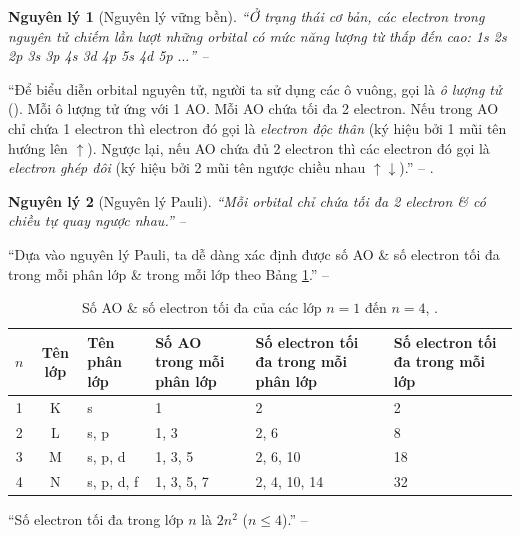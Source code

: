 \documentclass{article}
\numberwithin{equation}{section}
\newtheorem{nguyenly}{Nguyên lý}[section]
\begin{document}
\begin{nguyenly}[Nguyên lý vững bền]
	``Ở trạng thái cơ bản, các electron trong nguyên tử chiếm lần lượt những orbital có mức năng lượng từ thấp đến cao: 1s 2s 2p 3s 3p 4s 3d 4p 5s 4d 5p $\ldots$'' -- \cite[p. 30]{SGK_Hoa_Hoc_10_Chan_Troi_Sang_Tao}
\end{nguyenly}
``Để biểu diễn orbital nguyên tử, người ta sử dụng các ô vuông, gọi là \textit{ô lượng tử} (\cite[Hình 4.8: \textsf{(a) Chiều chuyển động tự quay của electron quanh trục của nó; (b) Cách biểu diễn 2 electron trong 1 orbital}, p. 30]{SGK_Hoa_Hoc_10_Chan_Troi_Sang_Tao}). Mỗi ô lượng tử ứng với 1 AO. Mỗi AO chứa tối đa 2 electron. Nếu trong AO chỉ chứa 1 electron thì electron đó gọi là \textit{electron độc thân} (ký hiệu bởi 1 mũi tên hướng lên $\uparrow$). Ngược lại, nếu AO chứa đủ 2 electron thì các electron đó gọi là \textit{electron ghép đôi} (ký hiệu bởi 2 mũi tên ngược chiều nhau $\uparrow\downarrow$).'' -- \cite[p. 30]{SGK_Hoa_Hoc_10_Chan_Troi_Sang_Tao}. \cite[Hình 4.9: \textsf{(a) Electron ghép đôi \& electron độc thân; (b) Sự sắp xếp electron trên các orbital của nguyên tử oxygen.}, p. 30]{SGK_Hoa_Hoc_10_Chan_Troi_Sang_Tao}

\begin{nguyenly}[Nguyên lý Pauli]
	``Mỗi orbital chỉ chứa tối đa 2 electron \& có chiều tự quay ngược nhau.'' -- \cite[p. 30]{SGK_Hoa_Hoc_10_Chan_Troi_Sang_Tao}
\end{nguyenly}
``Dựa vào nguyên lý Pauli, ta dễ dàng xác định được số AO \& số electron tối đa trong mỗi phân lớp \& trong mỗi lớp theo Bảng \ref{tab:so AO & so electron toi da cua cac lop n = 1 den n = 4}.'' -- \cite[p. 30]{SGK_Hoa_Hoc_10_Chan_Troi_Sang_Tao}

\begin{table}[h]
	\centering
	\begin{tabular}{|c|c|l|l|p{4cm}|p{3.5cm}|}
		\hline
		$n$ & \textbf{Tên lớp} & \textbf{Tên phân lớp} & \textbf{Số AO trong mỗi phân lớp} & \textbf{Số electron tối đa trong mỗi phân lớp} & \textbf{Số electron tối đa trong mỗi lớp} \\
		\hline
		1 & K & s & 1 & 2 & 2 \\
		\hline
		2 & L & s, p & 1, 3 & 2, 6 & 8 \\
		\hline
		3 & M & s, p, d & 1, 3, 5 & 2, 6, 10 & 18 \\
		\hline
		4 & N & s, p, d, f & 1, 3, 5, 7 & 2, 4, 10, 14 & 32 \\
		\hline
	\end{tabular}
	\caption{Số AO \& số electron tối đa của các lớp $n = 1$ đến $n = 4$, \cite[Bảng 4.1, p. 31]{SGK_Hoa_Hoc_10_Chan_Troi_Sang_Tao}.}
	\label{tab:so AO & so electron toi da cua cac lop n = 1 den n = 4}
\end{table}
``Số electron tối đa trong lớp $n$ là $2n^2$ ($n\le 4$).'' -- \cite[p. 31]{SGK_Hoa_Hoc_10_Chan_Troi_Sang_Tao}
\end{document}
